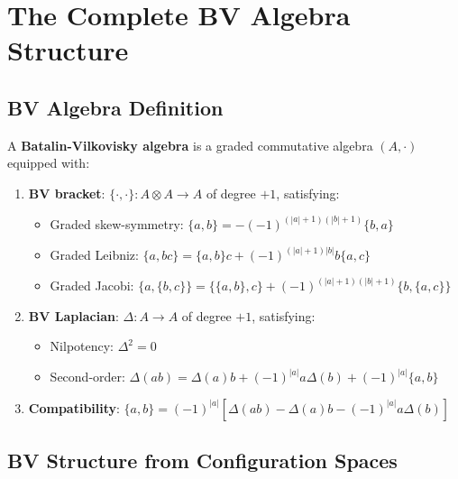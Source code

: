 
\section{The Complete BV Algebra Structure}
\label{sec:complete-bv-structure}

\subsection{BV Algebra Definition}

\begin{definition}
\label{def:bv-algebra-complete}
A \textbf{Batalin-Vilkovisky algebra} is a graded commutative algebra $(A, \cdot)$ equipped with:
\begin{enumerate}
\item \textbf{BV bracket}: $\{\cdot, \cdot\}: A \otimes A \to A$ of degree $+1$, satisfying:
\begin{itemize}
\item Graded skew-symmetry: $\{a, b\} = -(-1)^{(|a|+1)(|b|+1)} \{b, a\}$
\item Graded Leibniz: $\{a, bc\} = \{a, b\}c + (-1)^{(|a|+1)|b|} b\{a, c\}$
\item Graded Jacobi: $\{a, \{b, c\}\} = \{\{a, b\}, c\} + (-1)^{(|a|+1)(|b|+1)} \{b, \{a, c\}\}$
\end{itemize}

\item \textbf{BV Laplacian}: $\Delta: A \to A$ of degree $+1$, satisfying:
\begin{itemize}
\item Nilpotency: $\Delta^2 = 0$
\item Second-order: $\Delta(ab) = \Delta(a)b + (-1)^{|a|}a\Delta(b) + (-1)^{|a|}\{a, b\}$
\end{itemize}

\item \textbf{Compatibility}: $\{a, b\} = (-1)^{|a|} [\Delta(ab) - \Delta(a)b - (-1)^{|a|}a\Delta(b)]$
\end{enumerate}
\end{definition}

\subsection{BV Structure from Configuration Spaces}

